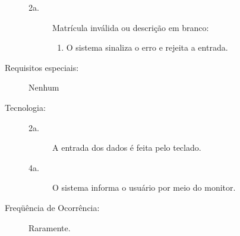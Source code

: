 \documentclass[brazil,times]{abnt}
\begin{document}
\begin{description}
\begin{description}
	\item[2a.] Matrícula inválida ou descrição em branco:
	\begin{enumerate}
		\item  O sistema sinaliza o erro e rejeita a entrada.
	\end{enumerate}
\end{description}
\item[Requisitos especiais:] Nenhum

\item[Tecnologia:] \hfill
\begin{description} 
	\item[2a.] A entrada dos dados é feita pelo teclado.
	\item[4a.] O sistema informa o usuário por meio do monitor.
\end{description}
\item[Freqüência de Ocorrência:] Raramente.

\end{description}
\end{document}

